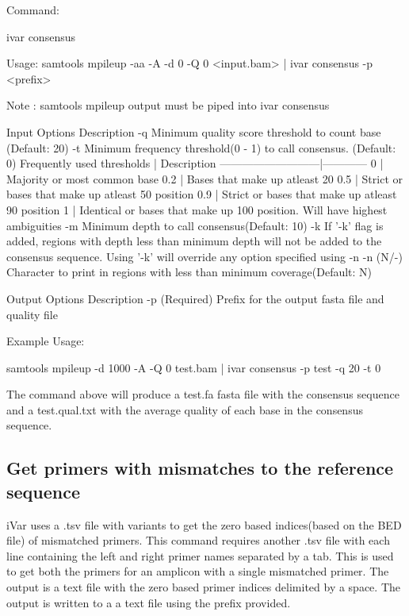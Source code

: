 Command\+:


\begin{DoxyCode}
ivar consensus

Usage: samtools mpileup -aa -A -d 0 -Q 0 <input.bam> | ivar consensus -p <prefix>

Note : samtools mpileup output must be piped into ivar consensus

Input Options    Description
           -q    Minimum quality score threshold to count base (Default: 20)
           -t    Minimum frequency threshold(0 - 1) to call consensus. (Default: 0)
                 Frequently used thresholds | Description
                 ---------------------------|------------
                                          0 | Majority or most common base
                                        0.2 | Bases that make up atleast 20%
                                        0.5 | Strict or bases that make up atleast 50%
       position
                                        0.9 | Strict or bases that make up atleast 90%
       position
                                          1 | Identical or bases that make up 100%
       position. Will have highest ambiguities
           -m    Minimum depth to call consensus(Default: 10)
           -k    If '-k' flag is added, regions with depth less than minimum depth will not be added to the
       consensus sequence. Using '-k' will override any option specified using -n
           -n    (N/-) Character to print in regions with less than minimum coverage(Default: N)

Output Options   Description
           -p    (Required) Prefix for the output fasta file and quality file
\end{DoxyCode}


Example Usage\+:


\begin{DoxyCode}
samtools mpileup -d 1000 -A -Q 0 test.bam | ivar consensus -p test -q 20 -t 0
\end{DoxyCode}


The command above will produce a test.\+fa fasta file with the consensus sequence and a test.\+qual.\+txt with the average quality of each base in the consensus sequence.\hypertarget{manualpage_autotoc_md20}{}\subsection{Get primers with mismatches to the reference sequence}\label{manualpage_autotoc_md20}
i\+Var uses a .tsv file with variants to get the zero based indices(based on the B\+E\+D file) of mismatched primers. This command requires another .tsv file with each line containing the left and right primer names separated by a tab. This is used to get both the primers for an amplicon with a single mismatched primer. The output is a text file with the zero based primer indices delimited by a space. The output is written to a a text file using the prefix provided.

